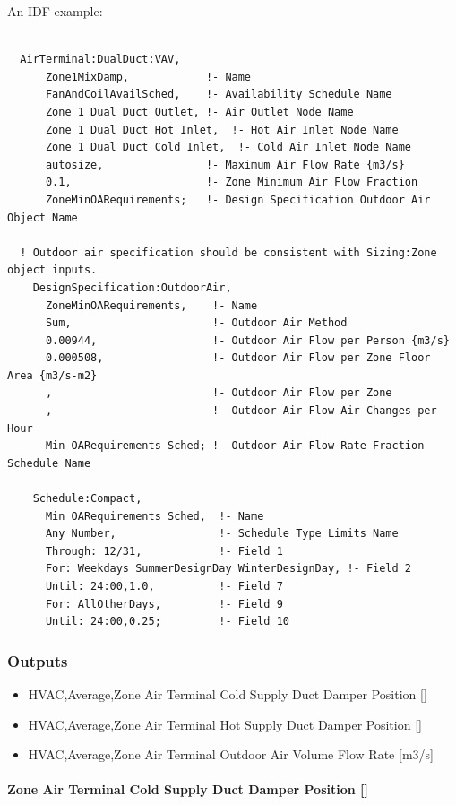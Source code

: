 An IDF example:

\begin{lstlisting}

  AirTerminal:DualDuct:VAV,
      Zone1MixDamp,            !- Name
      FanAndCoilAvailSched,    !- Availability Schedule Name
      Zone 1 Dual Duct Outlet, !- Air Outlet Node Name
      Zone 1 Dual Duct Hot Inlet,  !- Hot Air Inlet Node Name
      Zone 1 Dual Duct Cold Inlet,  !- Cold Air Inlet Node Name
      autosize,                !- Maximum Air Flow Rate {m3/s}
      0.1,                     !- Zone Minimum Air Flow Fraction
      ZoneMinOARequirements;   !- Design Specification Outdoor Air Object Name

  ! Outdoor air specification should be consistent with Sizing:Zone object inputs.
    DesignSpecification:OutdoorAir,
      ZoneMinOARequirements,    !- Name
      Sum,                      !- Outdoor Air Method
      0.00944,                  !- Outdoor Air Flow per Person {m3/s}
      0.000508,                 !- Outdoor Air Flow per Zone Floor Area {m3/s-m2}
      ,                         !- Outdoor Air Flow per Zone
      ,                         !- Outdoor Air Flow Air Changes per Hour
      Min OARequirements Sched; !- Outdoor Air Flow Rate Fraction Schedule Name

    Schedule:Compact,
      Min OARequirements Sched,  !- Name
      Any Number,                !- Schedule Type Limits Name
      Through: 12/31,            !- Field 1
      For: Weekdays SummerDesignDay WinterDesignDay, !- Field 2
      Until: 24:00,1.0,          !- Field 7
      For: AllOtherDays,         !- Field 9
      Until: 24:00,0.25;         !- Field 10
\end{lstlisting}

\subsubsection{Outputs}\label{outputs-13}

\begin{itemize}
\item
  HVAC,Average,Zone Air Terminal Cold Supply Duct Damper Position {[]}
\item
  HVAC,Average,Zone Air Terminal Hot Supply Duct Damper Position {[]}
\item
  HVAC,Average,Zone Air Terminal Outdoor Air Volume Flow Rate {[}m3/s{]}
\end{itemize}

\paragraph{Zone Air Terminal Cold Supply Duct Damper Position {[]}}\label{zone-air-terminal-cold-supply-duct-damper-position-1}

